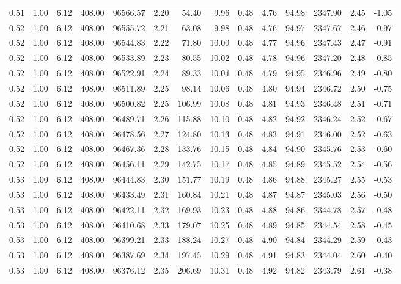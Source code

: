 \begin{table}[!ht]
\begin{tabular}{rrrrrrrrrrrrrr}
0.51 & 1.00 & 6.12 & 408.00 & 96566.57 & 2.20 & 54.40 & 9.96 & 0.48 & 4.76 & 94.98 & 2347.90 & 2.45 & -1.05 \\
0.52 & 1.00 & 6.12 & 408.00 & 96555.72 & 2.21 & 63.08 & 9.98 & 0.48 & 4.76 & 94.97 & 2347.67 & 2.46 & -0.97 \\
0.52 & 1.00 & 6.12 & 408.00 & 96544.83 & 2.22 & 71.80 & 10.00 & 0.48 & 4.77 & 94.96 & 2347.43 & 2.47 & -0.91 \\
0.52 & 1.00 & 6.12 & 408.00 & 96533.89 & 2.23 & 80.55 & 10.02 & 0.48 & 4.78 & 94.96 & 2347.20 & 2.48 & -0.85 \\
0.52 & 1.00 & 6.12 & 408.00 & 96522.91 & 2.24 & 89.33 & 10.04 & 0.48 & 4.79 & 94.95 & 2346.96 & 2.49 & -0.80 \\
0.52 & 1.00 & 6.12 & 408.00 & 96511.89 & 2.25 & 98.14 & 10.06 & 0.48 & 4.80 & 94.94 & 2346.72 & 2.50 & -0.75 \\
0.52 & 1.00 & 6.12 & 408.00 & 96500.82 & 2.25 & 106.99 & 10.08 & 0.48 & 4.81 & 94.93 & 2346.48 & 2.51 & -0.71 \\
0.52 & 1.00 & 6.12 & 408.00 & 96489.71 & 2.26 & 115.88 & 10.10 & 0.48 & 4.82 & 94.92 & 2346.24 & 2.52 & -0.67 \\
0.52 & 1.00 & 6.12 & 408.00 & 96478.56 & 2.27 & 124.80 & 10.13 & 0.48 & 4.83 & 94.91 & 2346.00 & 2.52 & -0.63 \\
0.52 & 1.00 & 6.12 & 408.00 & 96467.36 & 2.28 & 133.76 & 10.15 & 0.48 & 4.84 & 94.90 & 2345.76 & 2.53 & -0.60 \\
0.52 & 1.00 & 6.12 & 408.00 & 96456.11 & 2.29 & 142.75 & 10.17 & 0.48 & 4.85 & 94.89 & 2345.52 & 2.54 & -0.56 \\
0.53 & 1.00 & 6.12 & 408.00 & 96444.83 & 2.30 & 151.77 & 10.19 & 0.48 & 4.86 & 94.88 & 2345.27 & 2.55 & -0.53 \\
0.53 & 1.00 & 6.12 & 408.00 & 96433.49 & 2.31 & 160.84 & 10.21 & 0.48 & 4.87 & 94.87 & 2345.03 & 2.56 & -0.50 \\
0.53 & 1.00 & 6.12 & 408.00 & 96422.11 & 2.32 & 169.93 & 10.23 & 0.48 & 4.88 & 94.86 & 2344.78 & 2.57 & -0.48 \\
0.53 & 1.00 & 6.12 & 408.00 & 96410.68 & 2.33 & 179.07 & 10.25 & 0.48 & 4.89 & 94.85 & 2344.54 & 2.58 & -0.45 \\
0.53 & 1.00 & 6.12 & 408.00 & 96399.21 & 2.33 & 188.24 & 10.27 & 0.48 & 4.90 & 94.84 & 2344.29 & 2.59 & -0.43 \\
0.53 & 1.00 & 6.12 & 408.00 & 96387.69 & 2.34 & 197.45 & 10.29 & 0.48 & 4.91 & 94.83 & 2344.04 & 2.60 & -0.40 \\
0.53 & 1.00 & 6.12 & 408.00 & 96376.12 & 2.35 & 206.69 & 10.31 & 0.48 & 4.92 & 94.82 & 2343.79 & 2.61 & -0.38 \\

\end{tabular}
\end{table}

